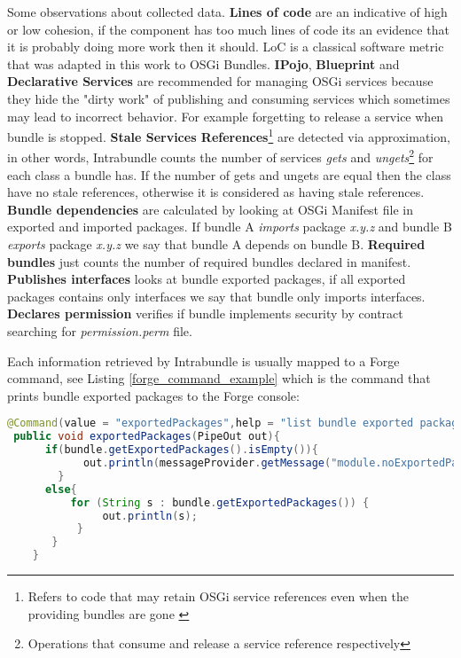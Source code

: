 Some observations about collected data. \textbf{Lines of code} are an indicative of high or low cohesion, if the component has too much lines of code its an evidence that it is probably doing more work then it should. LoC is a classical software metric that was adapted in this work to OSGi Bundles. 
\textbf{IPojo}, \textbf{Blueprint} and \textbf{Declarative Services} are recommended for managing OSGi services because they hide the "dirty work" of publishing and consuming services which sometimes may lead to incorrect behavior. For example forgetting to release a service when bundle is stopped.  
\textbf{Stale Services References}\footnote{Refers to code that may retain OSGi service references even when the providing bundles are gone \citep{Gama 2012}} are detected via approximation, in other words, Intrabundle counts the number of services \emph{gets} and \emph{ungets}\footnote{Operations that consume and release a service reference respectively} for each class a bundle has. If the number of gets and ungets are equal then the class have no stale references, otherwise it is considered as having stale references.
\textbf{Bundle dependencies} are calculated by looking at OSGi Manifest file in exported and imported packages. If bundle A \emph{imports} package \emph{x.y.z} and bundle B \emph{exports} package \emph{x.y.z} we say that bundle A depends on bundle B. 
\textbf{Required bundles} just counts the number of required bundles declared in manifest.
\textbf{Publishes interfaces} looks at bundle exported packages, if all exported packages contains only interfaces we say that bundle only imports interfaces.
\textbf{Declares permission} verifies if bundle implements security by contract searching for \emph{permission.perm} file.

Each information retrieved by Intrabundle is usually mapped to a Forge command, see Listing \ref{forge_command_example} which is the command that prints bundle exported packages to the Forge console:
\pagebreak
\begin{lstlisting}[language=java,label=forge_command_example,caption=Exported packages command]
 @Command(value = "exportedPackages",help = "list bundle exported packages")
 public void exportedPackages(PipeOut out){
      if(bundle.getExportedPackages().isEmpty()){
            out.println(messageProvider.getMessage("module.noExportedPackages"));
        }
      else{
          for (String s : bundle.getExportedPackages()) {
               out.println(s);
           }
       }
    }
\end{lstlisting}
\FloatBarrier

